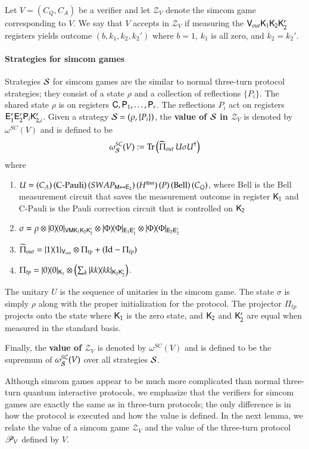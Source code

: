 Let $V = (C_Q,C_A)$ be a verifier and let $\mathscr{Z}_V$ denote the simcom game corresponding to $V$. We say that $V$ accepts in $\mathscr{Z}_V$ if measuring the ${\mathsf{V}}_{out} {\mathsf{K}}_1 {\mathsf{K}}_2 {\mathsf{K}}_2'$ registers yields outcome $(b,k_1,k_2,k_2')$ where $b = 1$, $k_1$ is all zero, and $k_2 = k_2'$. 

\paragraph{Strategies for simcom games} Strategies $\mathcal{S}$ for simcom games are the similar to normal three-turn protocol strategies; they consist of a state $\rho$ and a collection of reflections $\{ P_i \}$. The shared state $\rho$ is on registers ${\mathsf{C}}, {\mathsf{P}}_1,\ldots,{\mathsf{P}}_r$. The reflections $P_i$ act on registers ${\mathsf{E}}_1' {\mathsf{E}}_2' {\mathsf{P}}_i {\mathsf{K}}_{2,i}'$. Given a strategy $\mathcal{S} = (\rho,\{P_i\})$, the \textbf{value of $\mathcal{S}$ in $\mathscr{Z}_V$} is denoted by $\omega^{SC}(V)$ and is defined to be
\[
	\omega^{SC}_{\mathcal{S}}(V) := \operatorname{Tr} \left( \widetilde{\Pi}_{out} \, U \sigma U^\dagger\right)
\]
where
\begin{enumerate}
	\item $U =  (C_A) \,  (\text{C-Pauli}) \, (SWAP_{{\mathsf{M}} \leftrightarrow {\mathsf{E}}_2}) \, (H^{\otimes m}) \, (P)\, (\mathrm{Bell})\, (C_Q)$, where $\mathrm{Bell}$ is the Bell measurement circuit that saves the measurement outcome in register ${\mathsf{K}}_1$ and $\text{C-Pauli}$ is the Pauli correction circuit that is controlled on ${\mathsf{K}}_2$
	\item $\sigma = \rho \otimes |0\rangle\! \langle 0|_{{\mathsf{V}} {\mathsf{M}} {\mathsf{K}}_1 {\mathsf{K}}_2 {\mathsf{K}}_2'} \otimes |\Phi\rangle\! \langle \Phi|_{{\mathsf{E}}_1 {\mathsf{E}}_1'} \otimes |\Phi\rangle\! \langle \Phi|_{{\mathsf{E}}_2 {\mathsf{E}}_2'}$
	\item  $\widetilde{\Pi}_{out} = |1\rangle\! \langle 1|_{{\mathsf{V}}_{out}} \otimes \Pi_{tp} + (\mathop{\mathrm{Id}}\!\mathinner{} - \Pi_{tp})$
	\item $\Pi_{tp} = |0\rangle\! \langle 0|_{{\mathsf{K}}_1} \otimes \left( \sum_{k} |kk\rangle\! \langle kk|_{{\mathsf{K}}_2 {\mathsf{K}}_2'}\right)$.
\end{enumerate}
The unitary $U$ is the sequence of unitaries in the simcom game. The state $\sigma$ is simply $\rho$ along with the proper initialization for the protocol. The projector $\Pi_{tp}$ projects onto the state where ${\mathsf{K}}_1$ is the zero state, and ${\mathsf{K}}_2$ and ${\mathsf{K}}_2'$ are equal when measured in the standard basis.

Finally, the \textbf{value of $\mathscr{Z}_V$} is denoted by $\omega^{SC}(V)$ and is defined to be the supremum of $\omega^{SC}_{\mathcal{S}}(V)$ over all strategies $\mathcal{S}$.


Although simcom games appear to be much more complicated than normal three-turn quantum interactive protocols, we emphasize that the verifiers for simcom games are exactly the same as in three-turn protocols; the only difference is in how the protocol is executed and how the value is defined. In the next lemma, we relate the value of a simcom game $\mathscr{Z}_V$ and the value of the three-turn protocol $\mathscr{P}_V$ defined by $V$.

